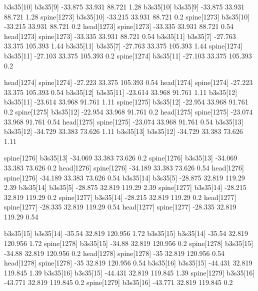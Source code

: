 b3s35[10]    b3s35[9]    -33.875    33.931    88.721    1.28
b3s35[10]    b3s35[9]    -33.875    33.931    88.721    1.28
spine[1273]    b3s35[10]    -33.215    33.931    88.721    0.2
spine[1273]    b3s35[10]    -33.215    33.931    88.721    0.2
head[1273]    spine[1273]    -33.335    33.931    88.721    0.54
head[1273]    spine[1273]    -33.335    33.931    88.721    0.54
b3s35[11]    b3s35[7]    -27.763    33.375    105.393    1.44
b3s35[11]    b3s35[7]    -27.763    33.375    105.393    1.44
spine[1274]    b3s35[11]    -27.103    33.375    105.393    0.2
spine[1274]    b3s35[11]    -27.103    33.375    105.393    0.2


head[1274]    spine[1274]    -27.223    33.375    105.393    0.54
head[1274]    spine[1274]    -27.223    33.375    105.393    0.54
b3s35[12]    b3s35[11]    -23.614    33.968    91.761    1.11
b3s35[12]    b3s35[11]    -23.614    33.968    91.761    1.11
spine[1275]    b3s35[12]    -22.954    33.968    91.761    0.2
spine[1275]    b3s35[12]    -22.954    33.968    91.761    0.2
head[1275]    spine[1275]    -23.074    33.968    91.761    0.54
head[1275]    spine[1275]    -23.074    33.968    91.761    0.54
b3s35[13]    b3s35[12]    -34.729    33.383    73.626    1.11
b3s35[13]    b3s35[12]    -34.729    33.383    73.626    1.11


spine[1276]    b3s35[13]    -34.069    33.383    73.626    0.2
spine[1276]    b3s35[13]    -34.069    33.383    73.626    0.2
head[1276]    spine[1276]    -34.189    33.383    73.626    0.54
head[1276]    spine[1276]    -34.189    33.383    73.626    0.54
b3s35[14]    b3s35[5]    -28.875    32.819    119.29    2.39
b3s35[14]    b3s35[5]    -28.875    32.819    119.29    2.39
spine[1277]    b3s35[14]    -28.215    32.819    119.29    0.2
spine[1277]    b3s35[14]    -28.215    32.819    119.29    0.2
head[1277]    spine[1277]    -28.335    32.819    119.29    0.54
head[1277]    spine[1277]    -28.335    32.819    119.29    0.54


b3s35[15]    b3s35[14]    -35.54    32.819    120.956    1.72
b3s35[15]    b3s35[14]    -35.54    32.819    120.956    1.72
spine[1278]    b3s35[15]    -34.88    32.819    120.956    0.2
spine[1278]    b3s35[15]    -34.88    32.819    120.956    0.2
head[1278]    spine[1278]    -35    32.819    120.956    0.54
head[1278]    spine[1278]    -35    32.819    120.956    0.54
b3s35[16]    b3s35[15]    -44.431    32.819    119.845    1.39
b3s35[16]    b3s35[15]    -44.431    32.819    119.845    1.39
spine[1279]    b3s35[16]    -43.771    32.819    119.845    0.2
spine[1279]    b3s35[16]    -43.771    32.819    119.845    0.2


